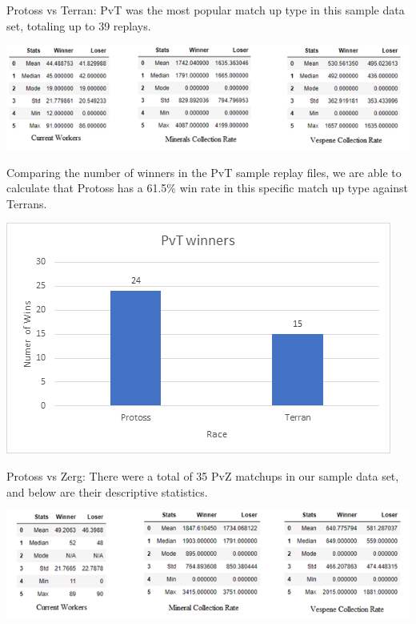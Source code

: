 \documentclass[a4paper,12pt]{report}
\begin{document}
Protoss vs Terran:
PvT was the most popular match up type in this sample data set, totaling up to 39 replays.

\begin{center}
    \captionsetup{type=figure}
    \includegraphics[width=.9\linewidth]{media/TerranWinnervsLoser.png}
\end{center}

Comparing the number of winners in the PvT sample replay files, we are able to calculate that Protoss has a 61.5\% win rate in this specific match up type against Terrans.

\begin{center}
    \captionsetup{type=figure}
    \includegraphics[width=.9\linewidth]{media/PvTwinrate.png}
\end{center}

Protoss vs Zerg:
There were a total of 35 PvZ matchups in our sample data set, and below are their descriptive statistics. 

\begin{center}
    \captionsetup{type=figure}
    \includegraphics[width=.9\linewidth]{media/workersCollectionPvZ.png}
\end{center}
\end{document}
